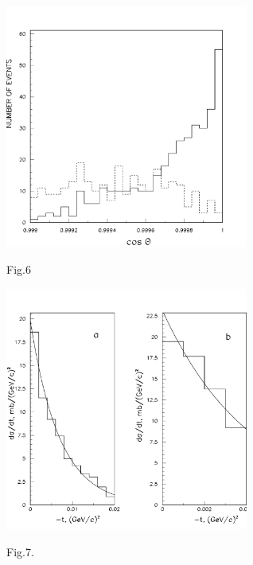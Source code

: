 \documentclass[a4paper,12pt]{article}
\begin{document}
    \begin{figure}[h]
      \begin{center}
        \includegraphics[width=8cm]{cospp.pdf}
      \end{center}
      \vspace{0,4mm}
      Fig.6
    \end{figure}
    \newpage
    \newpage
    \begin{figure}[hbt]
      \begin{center}
        \includegraphics[width=8cm]{ppnce.pdf}
      \end{center}
      \vspace{0,4mm}
      Fig.7.
    \end{figure}
\end{document}
